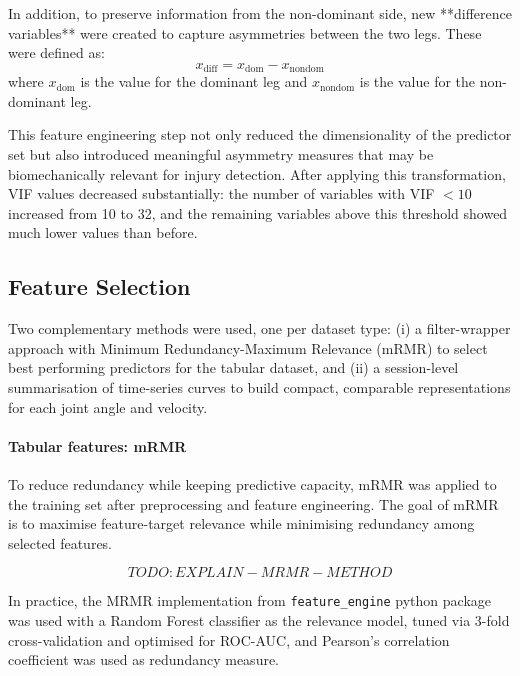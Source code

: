 In addition, to preserve information from the non-dominant side, new **difference variables** were created to capture asymmetries between the two legs. These were defined as:  
\begin{equation}
    x_{\mathrm{diff}} = x_{\mathrm{dom}} - x_{\mathrm{nondom}}
\end{equation}
where $x_{\mathrm{dom}}$ is the value for the dominant leg and $x_{\mathrm{nondom}}$ is the value for the non-dominant leg.  

This feature engineering step not only reduced the dimensionality of the predictor set but also introduced meaningful asymmetry measures that may be biomechanically relevant for injury detection. After applying this transformation, VIF values decreased substantially: the number of variables with VIF $< 10$ increased from 10 to 32, and the remaining variables above this threshold showed much lower values than before.  

\subsection{Feature Selection}\label{subsec:method-feature-selection}
Two complementary methods were used, one per dataset type: (i) a filter-wrapper approach with Minimum Redundancy-Maximum Relevance (mRMR) to select best performing predictors for the tabular dataset, and (ii) a session-level summarisation of time-series curves to build compact, comparable representations for each joint angle and velocity.

\paragraph{Tabular features: mRMR}
To reduce redundancy while keeping predictive capacity, mRMR \citep{DING2005} was applied to the training set after preprocessing and feature engineering. The goal of mRMR is to maximise feature-target relevance while minimising redundancy among selected features.

\begin{equation}
TODO: EXPLAIN-MRMR-METHOD
\end{equation}

In practice, the MRMR implementation from \texttt{feature\_engine} python package was used with a Random Forest classifier as the relevance model, tuned via 3-fold cross-validation and optimised for ROC-AUC, and Pearson's correlation coefficient was used as redundancy measure.

